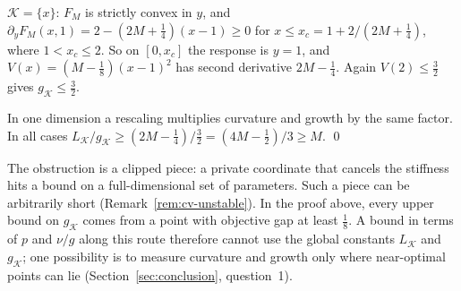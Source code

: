 $\mathcal K=\{x\}$: $F_M$ is strictly convex in $y$, and
$\partial_yF_M(x,1)=2-(2M+\frac14)(x-1)\ge0$ for
$x\le x_c=1+2/(2M+\frac14)$, where $1<x_c\le2$. So on $[0,x_c]$ the response
is $y=1$, and $V(x)=(M-\frac18)(x-1)^2$ has second derivative $2M-\frac14$.
Again $V(2)\le\frac32$ gives $g_{\mathcal K}\le\frac32$.

In one dimension a rescaling multiplies curvature and growth by the same
factor. In all cases
$L_{\mathcal K}/g_{\mathcal K}\ge(2M-\frac14)/\frac32=(4M-\frac12)/3\ge M$.
\qed

\medskip
The obstruction is a clipped piece: a private coordinate that cancels the
stiffness hits a bound on a full-dimensional set of parameters. Such a piece
can be arbitrarily short (Remark~\ref{rem:cv-unstable}). In the proof
above, every upper bound on
$g_{\mathcal K}$ comes from a point with objective gap at least $\frac18$. A
bound in terms of $p$ and $\nu/g$ along this route therefore cannot use the
global constants $L_{\mathcal K}$ and $g_{\mathcal K}$; one possibility is to
measure curvature and growth only where near-optimal points can lie
(Section~\ref{sec:conclusion}, question~1).
